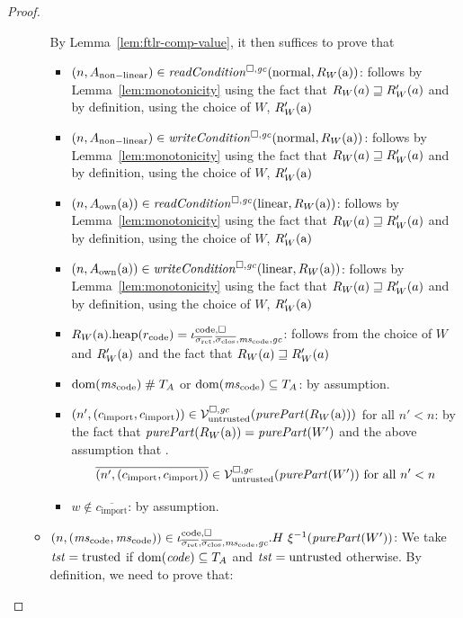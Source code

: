 \documentclass[a4paper]{article}
\begin{document}
\begin{proof}
\begin{itemize}
\begin{itemize}
      By Lemma~\ref{lem:ftlr-comp-value}, it then suffices to prove that
      \begin{itemize}
      \item $\npair{A_{\mathrm{non-linear}}} \in \readCond{\normal,R_W(\addr)}$: follows by Lemma~\ref{lem:monotonicity} using the fact that $R_W(a) \sqsupseteq R_W'(a)$ and by definition, using the choice of $W$, $R_W'(\mathrm{a})$ 
      \item $\npair{A_{\mathrm{non-linear}}} \in \writeCond{\normal,R_W(\addr)}$: follows by Lemma~\ref{lem:monotonicity} using the fact that $R_W(a) \sqsupseteq R_W'(a)$ and by definition, using the choice of $W$, $R_W'(\mathrm{a})$ 
      \item $\npair{A_{\mathrm{own}}(\addr)} \in \readCond{\linear,R_W(\addr)}$: follows by Lemma~\ref{lem:monotonicity} using the fact that $R_W(a) \sqsupseteq R_W'(a)$ and by definition, using the choice of $W$, $R_W'(\mathrm{a})$ 
      \item $\npair{A_{\mathrm{own}}(\addr)} \in \writeCond{\linear,R_W(\addr)}$: follows by Lemma~\ref{lem:monotonicity} using the fact that $R_W(a) \sqsupseteq R_W'(a)$ and by definition, using the choice of $W$, $R_W'(\mathrm{a})$ 
      \item $\pwheap[R_W(\addr)](r_{\mathrm{code}}) = \codereg{\sigrets,\sigcloss,\mscode,\gc}$: follows from the choice of $W$ and $R_W'(\mathrm{a})$ and the fact that $R_W(a) \sqsupseteq R_W'(a)$
      \item $\dom(\mscode) \mathrel{\#} \ta$ or $\dom(\mscode) \subseteq \ta$: by assumption.
      \item $\npair[n']{(c_{\mathrm{import}},c_{\mathrm{import}})} \in \lrv(\purePart{R_W(\addr)})$ for all $n' < n$: by the fact that $\purePart{R_W(\addr)} = \purePart{W'}$ and the above assumption that .
        \begin{equation*}
          \overline{\npair[n']{(c_{\mathrm{import}},c_{\mathrm{import}})}} \in \lrv(\purePart{W'}) \text{ for all $n' < n$} 
        \end{equation*}
      \item $w \not\in \overline{c_{\mathrm{import}}}$: by assumption.
      \end{itemize}
    \item $\npair{(\mscode,\mscode)} \in  \codereg[\mathrm{code},\square]{\sigrets,\sigcloss,\mscode,\gc}.H~ \xi^{-1}(\purePart{W'})$:
      We take $\mathit{tst} = \mathrm{trusted}$ if $\mathrm{dom}(\mathit{code}) \subseteq T_{A}$ and $\mathit{tst} =\mathrm{untrusted}$ otherwise.
      By definition, we need to prove that:
      

\end{itemize}
\end{itemize}
\end{proof}
\end{document}
